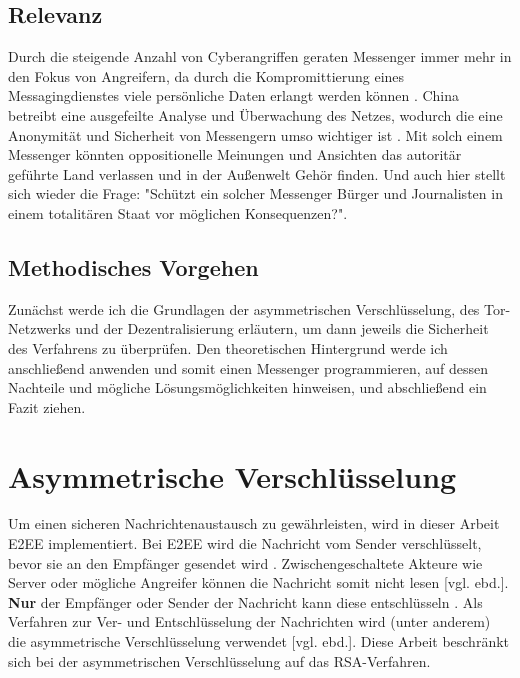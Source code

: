 \documentclass[a4paper,ngerman, headheight=28pt,12pt]{scrartcl}
\newcommand{\vcite}[1]{\cite[vgl.][]{#1}}
\newcommand{\vebd}{[vgl. ebd.]}
\begin{document}
\subsection{Relevanz}
Durch die steigende Anzahl von Cyberangriffen geraten  Messenger immer mehr in den Fokus von Angreifern, da durch die Kompromittierung eines Messagingdienstes viele persönliche Daten erlangt werden können \vcite{Cyberattacks}. China betreibt eine ausgefeilte Analyse und Überwachung des Netzes, wodurch die eine Anonymität und Sicherheit von Messengern umso wichtiger ist \vcite{GreatFirewallChina}. Mit solch einem Messenger könnten oppositionelle Meinungen und Ansichten das autoritär geführte Land verlassen und in der Außenwelt Gehör finden. Und auch hier stellt sich wieder die Frage: "Schützt ein solcher Messenger Bürger und Journalisten in einem totalitären Staat vor möglichen Konsequenzen?".

\subsection{Methodisches Vorgehen}
Zunächst werde ich die Grundlagen der asymmetrischen Verschlüsselung, des Tor-Netzwerks und der Dezentralisierung erläutern, um dann jeweils die Sicherheit des Verfahrens zu überprüfen. Den theoretischen Hintergrund werde ich anschließend anwenden und somit einen Messenger programmieren, auf dessen Nachteile und mögliche Lösungsmöglichkeiten hinweisen, und abschließend ein Fazit ziehen.

\section{Asymmetrische Verschlüsselung}
Um einen sicheren Nachrichtenaustausch zu gewährleisten, wird in dieser Arbeit E2EE implementiert. Bei E2EE wird die Nachricht vom Sender verschlüsselt, bevor sie an den Empfänger gesendet wird \vcite{E2EE}. Zwischengeschaltete Akteure wie Server oder mögliche Angreifer können die Nachricht somit nicht lesen \vebd. \textbf{Nur} der Empfänger oder Sender der Nachricht kann diese entschlüsseln \vcite{E2EE-Method}. Als Verfahren zur Ver- und Entschlüsselung der Nachrichten wird (unter anderem) die asymmetrische Verschlüsselung verwendet \vebd. Diese Arbeit beschränkt sich bei der asymmetrischen Verschlüsselung auf das RSA-Verfahren.

\end{document}
